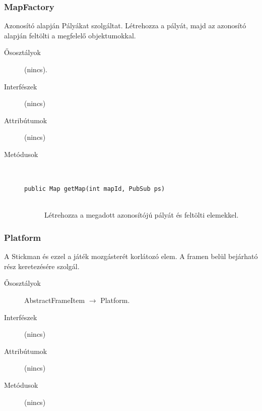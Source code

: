 		\subsubsection{MapFactory}
				 Azonosító alapján Pályákat szolgáltat.  Létrehozza a pályát, majd az azonosító alapján feltölti  a megfelelő objektumokkal. 			\begin{description}


				\item[Ősosztályok] (nincs).
				\item[Interfészek] (nincs)
				\item[Attribútumok] (nincs)
				\item[Metódusok]$\ $
					\begin{description}
						\item[\texttt{public Map getMap(int mapId, PubSub ps)}] \hfill \\ Létrehozza a megadott azonosítójú pályát  és feltölti elemekkel. 
					\end{description}
			\end{description}

		\subsubsection{Platform}
				 A Stickman és ezzel a játék mozgásterét korlátozó elem. A framen belül bejárható rész keretezésére szolgál. 			\begin{description}


				\item[Ősosztályok] AbstractFrameItem $\rightarrow{}$ Platform.
				\item[Interfészek] (nincs)
				\item[Attribútumok] (nincs)
				\item[Metódusok] (nincs)
			\end{description}

